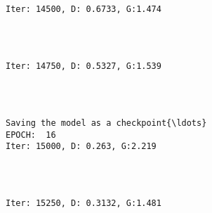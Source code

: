 \documentclass[11pt]{article}
\begin{document}
    \begin{center}
    \end{center}
    { \hspace*{\fill} \\}
    
    \begin{Verbatim}[commandchars=\\\{\}]

Iter: 14500, D: 0.6733, G:1.474
    \end{Verbatim}

    \begin{center}
    \end{center}
    { \hspace*{\fill} \\}
    
    \begin{Verbatim}[commandchars=\\\{\}]

Iter: 14750, D: 0.5327, G:1.539
    \end{Verbatim}

    \begin{center}
    \end{center}
    { \hspace*{\fill} \\}
    
    \begin{Verbatim}[commandchars=\\\{\}]

Saving the model as a checkpoint{\ldots}
EPOCH:  16
Iter: 15000, D: 0.263, G:2.219
    \end{Verbatim}

    \begin{center}
    \end{center}
    { \hspace*{\fill} \\}
    
    \begin{Verbatim}[commandchars=\\\{\}]

Iter: 15250, D: 0.3132, G:1.481
    \end{Verbatim}
\end{document}
